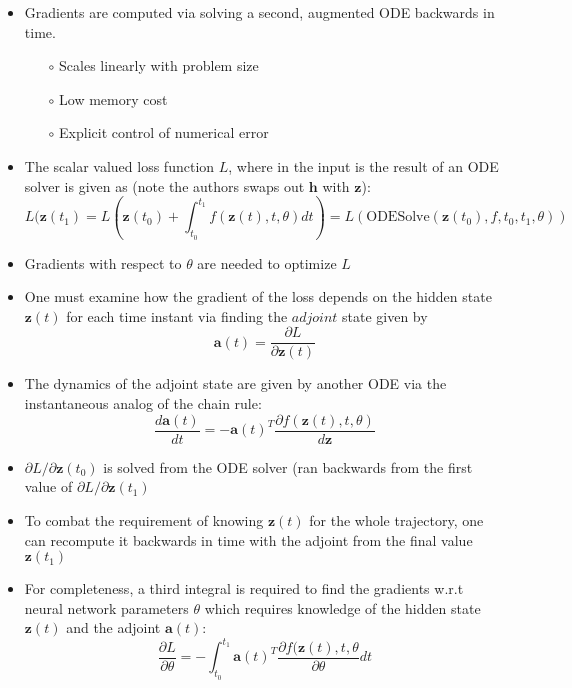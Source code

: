 \documentclass[10pt,a4paper]{article}
\begin{document}
\begin{itemize}
    \item Gradients are computed via solving a second, augmented ODE backwards in time.
    \begin{itemize}
        \item[$\circ$] Scales linearly with problem size
        \item[$\circ$] Low memory cost
        \item[$\circ$] Explicit control of numerical error
    \end{itemize}
    \item The scalar valued loss function $L$, where in the input is the result of an ODE solver is given as (note the authors swaps out $\textbf{h}$ with $\textbf{z}$):
    \begin{equation}
        L(\textbf{z}(t_{1}) = L \left( \textbf{z}(t_{0}) + \int_{t_{0}}^{t_{1}} f(\textbf{z}(t), t, \theta) dt \right) = L(\textrm{ODESolve}(\textbf{z}(t_{0}), f, t_{0}, t_{1}, \theta))
    \end{equation}
    \item Gradients with respect to $\theta$ are needed to optimize $L$
    \item One must examine how the gradient of the loss depends on the hidden state $\textbf{z}(t)$ for each time instant via finding the $\textit{adjoint}$ state given by
    \begin{equation}
        \textbf{a}(t) = \frac{\partial L }{\partial \textbf{z}(t)}
    \end{equation}
    \item The dynamics of the adjoint state are given by another ODE via the instantaneous analog of the chain rule:
    \begin{equation}
        \frac{d\textbf{a}(t)}{dt} = -\textbf{a}(t)^{T} \frac{\partial f(\textbf{z}(t), t, \theta)}{d\textbf{z}}
    \end{equation}
    \item $\partial L/ \partial \textbf{z}(t_{0})$ is solved from the ODE solver (ran backwards from the first value of $\partial L/ \partial \textbf{z}(t_{1})$
    \item To combat the requirement of knowing $\textbf{z}(t)$ for the whole trajectory, one can recompute it backwards in time with the adjoint from the final value $\textbf{z}(t_{1})$
    \item For completeness, a third integral is required to find the gradients w.r.t neural network parameters $\theta$ which requires knowledge of the hidden state $\textbf{z}(t)$ and the adjoint $\textbf{a}(t)$:
    \begin{equation}
        \frac{\partial L}{\partial \theta} = - \int_{t_{0}}^{t_{1}} \textbf{a}(t)^{T} \frac{\partial f(\textbf{z}(t), t, \theta}{\partial \theta} dt 
    \end{equation}
    

\end{itemize}
\end{document}
